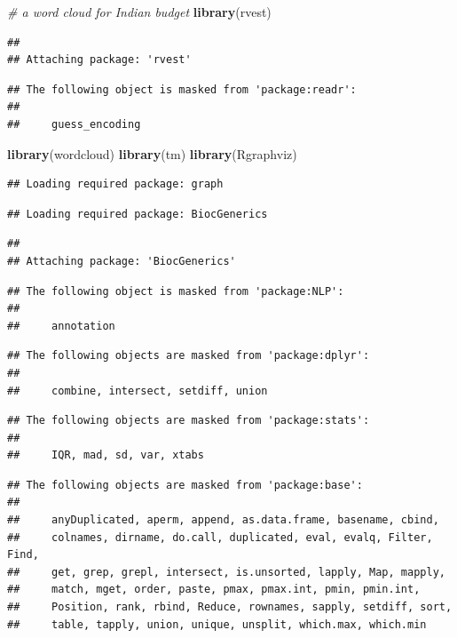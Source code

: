 \documentclass[
]{book}
\newenvironment{Shaded}{\begin{snugshade}}{\end{snugshade}}
\newcommand{\CommentTok}[1]{\textcolor[rgb]{0.56,0.35,0.01}{\textit{#1}}}
\newcommand{\FunctionTok}[1]{\textcolor[rgb]{0.13,0.29,0.53}{\textbf{#1}}}
\newcommand{\NormalTok}[1]{#1}
\begin{document}
\begin{Shaded}
\begin{Highlighting}[]
\CommentTok{\# a word cloud for Indian budget}
\FunctionTok{library}\NormalTok{(rvest)}
\end{Highlighting}
\end{Shaded}

\begin{verbatim}
## 
## Attaching package: 'rvest'
\end{verbatim}

\begin{verbatim}
## The following object is masked from 'package:readr':
## 
##     guess_encoding
\end{verbatim}

\begin{Shaded}
\begin{Highlighting}[]
\FunctionTok{library}\NormalTok{(wordcloud)}
\FunctionTok{library}\NormalTok{(tm)}
\FunctionTok{library}\NormalTok{(Rgraphviz)}
\end{Highlighting}
\end{Shaded}

\begin{verbatim}
## Loading required package: graph
\end{verbatim}

\begin{verbatim}
## Loading required package: BiocGenerics
\end{verbatim}

\begin{verbatim}
## 
## Attaching package: 'BiocGenerics'
\end{verbatim}

\begin{verbatim}
## The following object is masked from 'package:NLP':
## 
##     annotation
\end{verbatim}

\begin{verbatim}
## The following objects are masked from 'package:dplyr':
## 
##     combine, intersect, setdiff, union
\end{verbatim}

\begin{verbatim}
## The following objects are masked from 'package:stats':
## 
##     IQR, mad, sd, var, xtabs
\end{verbatim}

\begin{verbatim}
## The following objects are masked from 'package:base':
## 
##     anyDuplicated, aperm, append, as.data.frame, basename, cbind,
##     colnames, dirname, do.call, duplicated, eval, evalq, Filter, Find,
##     get, grep, grepl, intersect, is.unsorted, lapply, Map, mapply,
##     match, mget, order, paste, pmax, pmax.int, pmin, pmin.int,
##     Position, rank, rbind, Reduce, rownames, sapply, setdiff, sort,
##     table, tapply, union, unique, unsplit, which.max, which.min
\end{verbatim}
\end{document}
